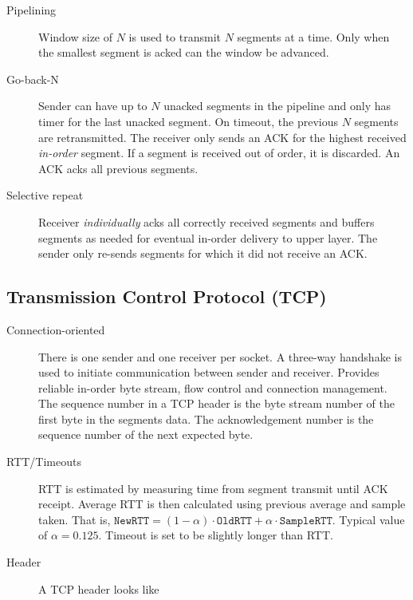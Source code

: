 \documentclass{article}
\begin{document}
\begin{description}
    \item[Pipelining] Window size of $N$ is used to transmit $N$ segments at a time. Only when the
    smallest segment is acked can the window be advanced.
    
    \item[Go-back-N] Sender can have up to $N$ unacked segments in the pipeline and only has timer for
    the last unacked segment. On timeout, the previous $N$ segments are retransmitted. The receiver
    only sends an ACK for the highest received \textit{in-order} segment. If a segment is received
    out of order, it is discarded. An ACK acks all previous segments.
    
    \item[Selective repeat] Receiver \textit{individually} acks all correctly received segments and
    buffers segments as needed for eventual in-order delivery to upper layer. The sender only re-sends
    segments for which it did not receive an ACK.
\end{description}

\subsection*{Transmission Control Protocol (TCP)}

\begin{description}
    \item[Connection-oriented] There is one sender and one receiver per socket. A three-way handshake
    is used to initiate communication between sender and receiver. Provides reliable in-order byte stream,
    flow control and connection management. The sequence number in a TCP header is the byte stream
    number of the first byte in the segments data. The acknowledgement number is the sequence number
    of the next expected byte. 
    
    \item[RTT/Timeouts] RTT is estimated by measuring time from segment transmit until ACK receipt.
    Average RTT is then calculated using previous average and sample taken. That is, 
    $\texttt{NewRTT}=(1-\alpha)\cdot\texttt{OldRTT}+\alpha\cdot\texttt{SampleRTT}.$
    Typical value of $\alpha=0.125$. Timeout is set to be slightly longer than RTT.
    
    \item[Header] A TCP header looks like
\end{description}
\end{document}
